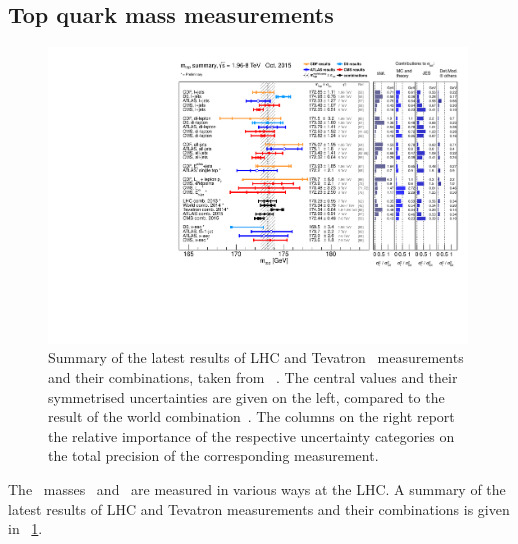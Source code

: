 \subsection{Top quark mass measurements}
\label{sect:TopQuarkMassMeasurements}

%
\begin{figure}[tb!]
\centering
\includegraphics[width=0.99\textwidth]{./figs/mass_summary_sep2015.pdf}
\vspace{-0.3cm}
\caption[Summary of \mt\ measurements]{
%
Summary of the latest results of \gls{LHC} and Tevatron \mt\ measurements and their combinations, taken from ~\cite{Cortiana:2015rca}.
%
The central values and their symmetrised uncertainties are given on the left, compared to the result of the world combination~\cite{ATLAS:2014wva}. The columns on the right report the relative importance of the respective uncertainty categories on the total precision of the corresponding measurement.
%
\label{fig:mass_summary_sep2015}}
\vspace{-0.2cm}
\end{figure}
%
The \tquark\ masses \mtpole\ and \mtMC\ are measured in various ways at the \gls{LHC}. A summary of the latest results of \gls{LHC} and Tevatron measurements and their combinations is given in \fig~\ref{fig:mass_summary_sep2015}. 

